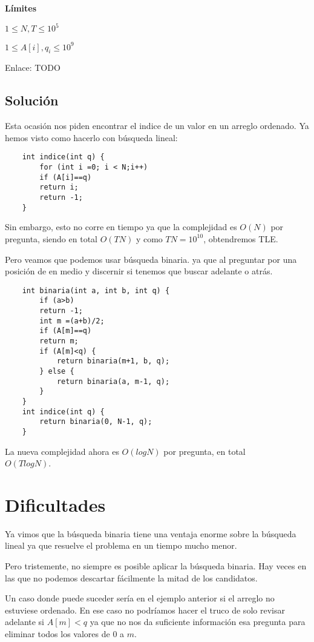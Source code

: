 \textbf{Límites}
\begin{plimits}
	\item \(1\leq N,T \leq 10^5 \)
	\item \(1\leq A[i], q_i \leq 10^9 \)
\end{plimits}

Enlace: TODO

\subsection*{Solución}
Esta ocasión nos piden encontrar el indice de un valor en un arreglo ordenado. Ya hemos visto como hacerlo con búsqueda lineal:

\begin{lstlisting}
	int indice(int q) {
		for (int i =0; i < N;i++) 
		if (A[i]==q)
		return i;
		return -1;
	}
\end{lstlisting}

Sin embargo, esto no corre en tiempo ya que la complejidad es \(O(N)\) por pregunta, siendo en total \(O(TN)\) y como \(TN=10^{10}\), obtendremos TLE.

Pero veamos que podemos usar búsqueda binaria. ya que al preguntar por una posición de en medio y discernir si tenemos que buscar adelante o atrás.

\begin{lstlisting}
	int binaria(int a, int b, int q) {
		if (a>b)
		return -1;
		int m =(a+b)/2;
		if (A[m]==q)
		return m;
		if (A[m]<q) {
			return binaria(m+1, b, q);
		} else {
			return binaria(a, m-1, q);
		}		
	}
	int indice(int q) {
		return binaria(0, N-1, q);
	}
\end{lstlisting}

La nueva complejidad ahora es \(O(logN)\) por pregunta, en total\\ \(O(TlogN)\).

\section{Dificultades}
Ya vimos que la búsqueda binaria tiene una ventaja enorme sobre la búsqueda lineal ya que resuelve el problema en un tiempo mucho menor.

Pero tristemente, no siempre es posible aplicar la búsqueda binaria. Hay veces en las que no podemos descartar fácilmente la mitad de los candidatos.

Un caso donde puede suceder sería en el ejemplo anterior si el arreglo no estuviese ordenado. En ese caso no podríamos hacer el truco de solo revisar adelante si \(A[m]<q\) ya que no nos da suficiente información esa pregunta para eliminar todos los valores de \(0\) a \(m\).

